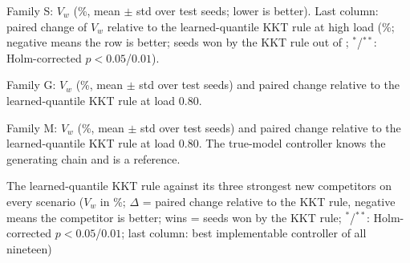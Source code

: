 \documentclass[journal]{IEEEtran}
\begin{document}
\begin{table}[t]
\caption{Family S: $V_w$ (\%, mean $\pm$ std over \xnSeedsS{} test seeds; lower is better). Last column: paired change of $V_w$ relative to the learned-quantile KKT rule at high load (\%; negative means the row is better; seeds won by the KKT rule out of \xnSeedsS{}; $^{\ast}$/$^{\ast\ast}$: Holm-corrected $p < 0.05$/$0.01$).}
\label{tab:main_S}
\centering
\footnotesize
\setlength{\tabcolsep}{3pt}

\end{table}

\begin{table}[t]
\caption{Family G: $V_w$ (\%, mean $\pm$ std over \xnSeedsG{} test seeds) and paired change relative to the learned-quantile KKT rule at load 0.80.}
\label{tab:main_G}
\centering
\footnotesize
\setlength{\tabcolsep}{3pt}

\end{table}

\begin{table}[t]
\caption{Family M: $V_w$ (\%, mean $\pm$ std over \xnSeedsM{} test seeds) and paired change relative to the learned-quantile KKT rule at load 0.80. The true-model controller knows the generating chain and is a reference.}
\label{tab:main_M}
\centering
\footnotesize
\setlength{\tabcolsep}{3pt}

\end{table}

\begin{table}[t]
\caption{The learned-quantile KKT rule against its three strongest new competitors on every scenario ($V_w$ in \%; $\Delta$ = paired change relative to the KKT rule, negative means the competitor is better; wins = seeds won by the KKT rule; $^{\ast}$/$^{\ast\ast}$: Holm-corrected $p<0.05$/$0.01$; last column: best implementable controller of all nineteen)}
\label{tab:h2h}
\centering
\scriptsize
\setlength{\tabcolsep}{3pt}

\end{table}
\end{document}
